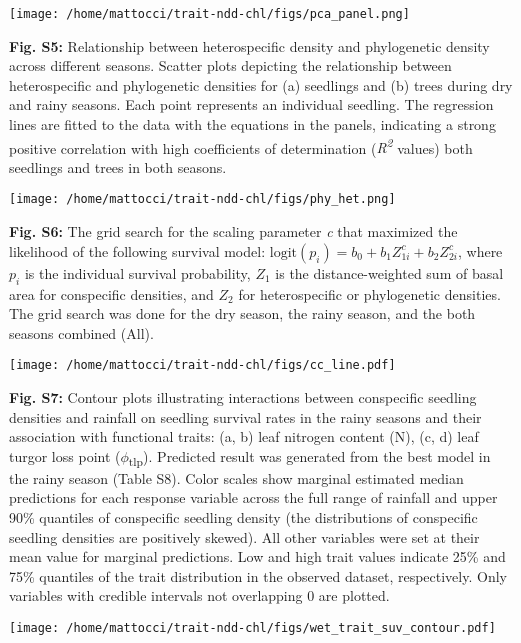 \documentclass[
  12pt,
  letterpaper,
  DIV=11,
  numbers=noendperiod]{scrartcl}
\begin{document}
\texttt{[image: /home/mattocci/trait-ndd-chl/figs/pca\_panel.png]}

\newpage

\textbf{Fig. S5:} Relationship between heterospecific density and
phylogenetic density across different seasons. Scatter plots depicting
the relationship between heterospecific and phylogenetic densities for
(a) seedlings and (b) trees during dry and rainy seasons. Each point
represents an individual seedling. The regression lines are fitted to
the data with the equations in the panels, indicating a strong positive
correlation with high coefficients of determination
(\emph{R\textsuperscript{2}} values) both seedlings and trees in both
seasons.

\texttt{[image: /home/mattocci/trait-ndd-chl/figs/phy\_het.png]}

\newpage

\textbf{Fig. S6:} The grid search for the scaling parameter \emph{c}
that maximized the likelihood of the following survival model:
\(\mathrm{logit}(p_i) = b_0 + b_1 Z_{1i}^c + b_2 Z_{2i}^c\), where
\(p_i\) is the individual survival probability, \(Z_1\) is the
distance-weighted sum of basal area for conspecific densities, and
\(Z_2\) for heterospecific or phylogenetic densities. The grid search
was done for the dry season, the rainy season, and the both seasons
combined (All).

\texttt{[image: /home/mattocci/trait-ndd-chl/figs/cc\_line.pdf]}

\newpage

\textbf{Fig. S7:} Contour plots illustrating interactions between
conspecific seedling densities and rainfall on seedling survival rates
in the rainy seasons and their association with functional traits: (a,
b) leaf nitrogen content (N), (c, d) leaf turgor loss point
(\(\phi\)\textsubscript{tlp}). Predicted result was generated from the
best model in the rainy season (Table S8). Color scales show marginal
estimated median predictions for each response variable across the full
range of rainfall and upper 90\% quantiles of conspecific seedling
density (the distributions of conspecific seedling densities are
positively skewed). All other variables were set at their mean value for
marginal predictions. Low and high trait values indicate 25\% and 75\%
quantiles of the trait distribution in the observed dataset,
respectively. Only variables with credible intervals not overlapping 0
are plotted.

\texttt{[image: /home/mattocci/trait-ndd-chl/figs/wet\_trait\_suv\_contour.pdf]}
\end{document}

